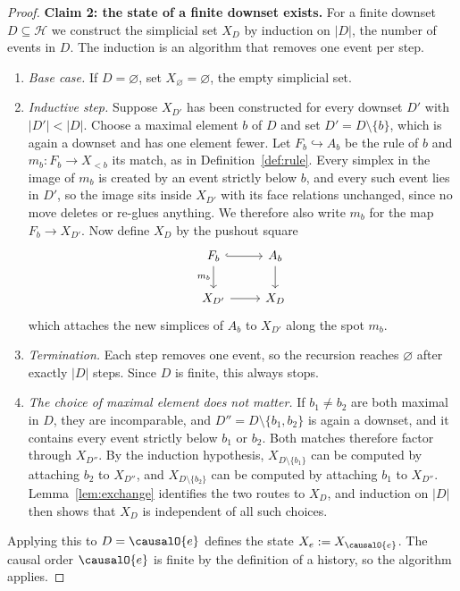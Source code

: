 \begin{proof}
\medskip
\noindent\textbf{Claim 2: the state of a finite downset exists.}
For a finite downset $D \subseteq \mathcal{H}$ we construct the simplicial set $X_D$ by induction on $|D|$, the number of events in $D$.
The induction is an algorithm that removes one event per step.
\begin{enumerate}
  \item \emph{Base case.}
        If $D = \varnothing$, set $X_\varnothing = \varnothing$, the empty simplicial set.
  \item \emph{Inductive step.}
        Suppose $X_{D'}$ has been constructed for every downset $D'$ with $|D'| < |D|$.
        Choose a maximal element $b$ of $D$ and set $D' = D \setminus \{b\}$, which is again a downset and has one element fewer.
        Let $F_b \hookrightarrow A_b$ be the rule of $b$ and $m_b : F_b \to X_{<b}$ its match, as in Definition~\ref{def:rule}.
        Every simplex in the image of $m_b$ is created by an event strictly below $b$, and every such event lies in $D'$, so the image sits inside $X_{D'}$ with its face relations unchanged, since no move deletes or re-glues anything.
        We therefore also write $m_b$ for the map $F_b \to X_{D'}$.
        Now define $X_D$ by the pushout square
        \[
        \begin{tikzcd}
          F_b \arrow[r, hook] \arrow[d, "m_b"'] & A_b \arrow[d] \\
          X_{D'} \arrow[r]                    & X_D
        \end{tikzcd}
        \]
        which attaches the new simplices of $A_b$ to $X_{D'}$ along the spot $m_b$.
  \item \emph{Termination.}
        Each step removes one event, so the recursion reaches $\varnothing$ after exactly $|D|$ steps.
        Since $D$ is finite, this always stops.
  \item \emph{The choice of maximal element does not matter.}
        If $b_1 \neq b_2$ are both maximal in $D$, they are incomparable, and $D'' = D \setminus \{b_1, b_2\}$ is again a downset, and it contains every event strictly below $b_1$ or $b_2$.
        Both matches therefore factor through $X_{D''}$.
        By the induction hypothesis, $X_{D \setminus \{b_1\}}$ can be computed by attaching $b_2$ to $X_{D''}$, and $X_{D \setminus \{b_2\}}$ can be computed by attaching $b_1$ to $X_{D''}$.
        Lemma~\ref{lem:exchange} identifies the two routes to $X_D$, and induction on $|D|$ then shows that $X_D$ is independent of all such choices.
\end{enumerate}
Applying this to $D = \causalO{e}$ defines the state $X_e := X_{\causalO{e}}$.
The causal order $\causalO{e}$ is finite by the definition of a history, so the algorithm applies.


\end{proof}
